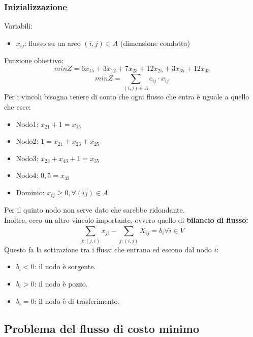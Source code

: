\documentclass[12pt,a4paper]{article}
\begin{document}
\subsubsection{Inizializzazione}
Variabili:
\begin{itemize}
    \item $x_{ij}$: flusso su un arco $(i,j) \in A$ (dimensione condotta)
\end{itemize}
Funzione obiettivo:
\[
minZ = 6x_{15}+3x_{12}+7x_{23}+12x_{25}+3x_{35}+12x_{43}
\]
\[
minZ = \sum_{(i,j) \in A}^{} c_{ij} \cdot x_{ij}
\]
Per i vincoli bisogna tenere di conto che ogni flusso che entra è uguale a quello che esce:\
\begin{itemize}
    \item Nodo1: $x_{21} + 1 = x_{15}$
    \item Nodo2: $1 = x_{21} + x_{23} + x_{25}$
    \item Nodo3: $x_{23} + x_{43} + 1 = x_{35}$
    \item Nodo4: $0,5 = x_{43}$
    \item Dominio: $x_{ij} \geq 0, \forall (ij) \in A$
\end{itemize}
Per il quinto nodo non serve dato che sarebbe ridondante.\\
Inoltre, ecco un altro vincolo importante, ovvero quello di \textbf{bilancio di flusso:}
\[
\sum_{j:(j,i)}^{} x_{ji} - \sum_{j:(i,j)}^{} X_{ij} = b_{i} \forall i \in V
\]
Questo fa la sottrazione tra i flussi che entrano ed escono dal nodo $i$:
\begin{itemize}
    \item $b_i < 0$: il nodo è sorgente.
    \item $b_i > 0$: il nodo è pozzo.
    \item $b_i = 0$: il nodo è di trasferimento.
\end{itemize}
\subsection{Problema del flusso di costo minimo}
\end{document}
